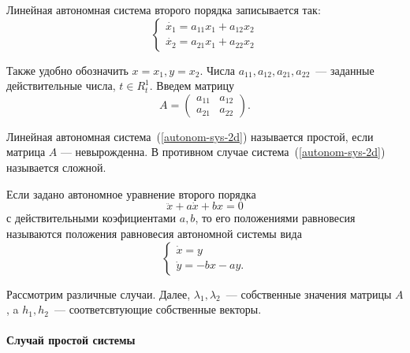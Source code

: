Линейная автономная система второго порядка записывается так:
\begin{equation}\label{autonom-sys-2d}
    \begin{cases}
    \dot{x_1} = a_{11} x_1 + a_{12} x_2 \\
    \dot{x_2} = a_{21} x_1 + a_{22} x_2
    \end{cases}
\end{equation}

Также удобно обозначить \(x = x_1, y = x_2\). Числа \(a_{11}, a_{12}, a_{21}, a_{22}\)~--- заданные действительные числа, \(t \in R_t^1\). Введем матрицу 
\[A = \begin{pmatrix} a_{11} & a_{12} \\ a_{21} & a_{22}\end{pmatrix}.\]

\begin{definition}
Линейная автономная система~(\ref{autonom-sys-2d}) называется простой, если матрица $A$ — невырожденна. В противном случае система~(\ref{autonom-sys-2d}) называется сложной.
\end{definition}

\begin{lemmanote}
Если задано автономное уравнение второго порядка
\begin{equation}
    \ddot{x} + a \dot{x} + b x = 0
\end{equation}
с действительными коэфициентами $a, b$, то его положениями равновесия называются положения равновесия автономной системы вида
\begin{equation}
\begin{cases}
\dot{x} = y\\
\dot{y} = -bx - ay.
\end{cases}
\end{equation}
\end{lemmanote}

Рассмотрим различные случаи. Далее, $\lambda_1, \lambda_2$~--- собственные значения матрицы $A$, a $h_1, h_2$~--- соответсвтующие собственные векторы. 

\paragraph{Случай простой системы}

